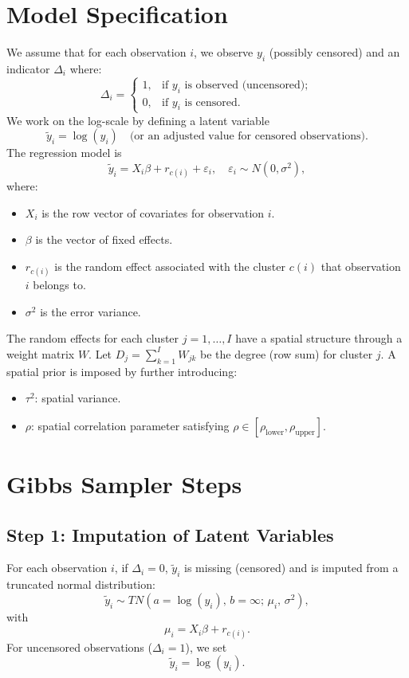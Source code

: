 \documentclass{article}
\begin{document}
\section*{Model Specification}
We assume that for each observation $i$, we observe $y_i$ (possibly censored) and an indicator $\Delta_i$ where:
\[
\Delta_i = \begin{cases}
1, & \text{if } y_i \text{ is observed (uncensored)};\\[1mm]
0, & \text{if } y_i \text{ is censored.}
\end{cases}
\]
We work on the log-scale by defining a latent variable 
\[
\tilde{y}_i = \log(y_i) \quad \text{(or an adjusted value for censored observations).}
\]
The regression model is
\[
\tilde{y}_i = X_i \beta + r_{c(i)} + \varepsilon_i, \quad \varepsilon_i \sim N(0,\sigma^2),
\]
where:
\begin{itemize}
  \item $X_i$ is the row vector of covariates for observation $i$.
  \item $\beta$ is the vector of fixed effects.
  \item $r_{c(i)}$ is the random effect associated with the cluster $c(i)$ that observation $i$ belongs to.
  \item $\sigma^2$ is the error variance.
\end{itemize}

The random effects for each cluster $j=1,\ldots,I$ have a spatial structure through a weight matrix $W$. Let $D_j = \sum_{k=1}^{I} W_{jk}$ be the degree (row sum) for cluster $j$. A spatial prior is imposed by further introducing:
\begin{itemize}
  \item $\tau^2$: spatial variance.
  \item $\rho$: spatial correlation parameter satisfying $\rho \in [\rho_{\text{lower}},\rho_{\text{upper}}]$.
\end{itemize}

\section*{Gibbs Sampler Steps}

\subsection*{Step 1: Imputation of Latent Variables}
For each observation $i$, if $\Delta_i = 0$, $\tilde{y}_i$ is missing (censored) and is imputed from a truncated normal distribution:
\[
\tilde{y}_i \sim TN\left(a = \log(y_i), \, b = \infty; \, \mu_i, \, \sigma^2\right),
\]
with
\[
\mu_i = X_i \beta + r_{c(i)}.
\]
For uncensored observations ($\Delta_i=1$), we set 
\[
\tilde{y}_i = \log(y_i).
\]
\end{document}
